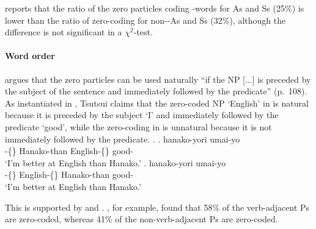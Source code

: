  reports that
the ratio of the zero particles coding -words for As and Ss (25\%) is lower than the ratio of zero-coding for non--As and Ss (32\%),
although the difference is not significant in a $\chi^{2}$-test.



\paragraph{Word order}

 argues that
the zero particles can be used naturally
``if the NP [...] is preceded by the subject of the sentence and immediately followed by the predicate'' (p.~108).
As instantiated in \Next,
Tsutsui claims that the zero-coded NP  `English' in \Next[a] is natural
because it is preceded by the subject  `I' and immediately followed by the predicate  `good',
while the zero-coding in \Next[b] is unnatural because
it is not immediately followed by the predicate.
%
\ex.
 \ag.  hanako-yori  umai-yo \\
      -\{\} Hanako-than English-\{\} good- \\
      `I'm better at English than Hanako.'
 \bg.   hanako-yori umai-yo \\
      -\{\} English-\{\} Hanako-than good- \\
      `I'm better at English than Hanako.'
      \hfill{\cite[110]{tsutsui84}}

This is supported by  and .
, for example, found that
58\% of the verb-adjacent Ps are zero-coded,
whereas 41\% of the non-verb-adjacent Ps are zero-coded.

